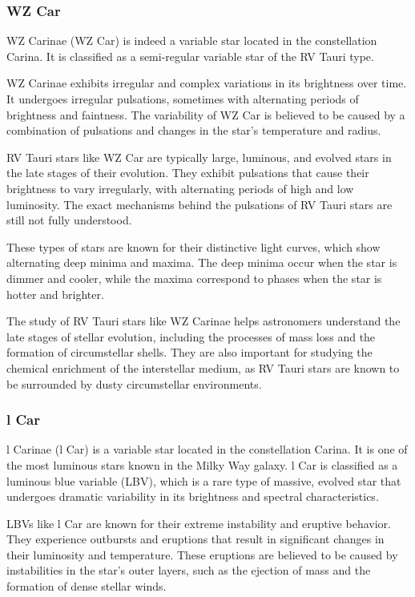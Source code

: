 \subsubsection*{ WZ Car }
WZ Carinae (WZ Car) is indeed a variable star located in the constellation Carina. It is classified as a semi-regular variable star of the RV Tauri type.

WZ Carinae exhibits irregular and complex variations in its brightness over time. It undergoes irregular pulsations, sometimes with alternating periods of brightness and faintness. The variability of WZ Car is believed to be caused by a combination of pulsations and changes in the star's temperature and radius.

RV Tauri stars like WZ Car are typically large, luminous, and evolved stars in the late stages of their evolution. They exhibit pulsations that cause their brightness to vary irregularly, with alternating periods of high and low luminosity. The exact mechanisms behind the pulsations of RV Tauri stars are still not fully understood.

These types of stars are known for their distinctive light curves, which show alternating deep minima and maxima. The deep minima occur when the star is dimmer and cooler, while the maxima correspond to phases when the star is hotter and brighter.

The study of RV Tauri stars like WZ Carinae helps astronomers understand the late stages of stellar evolution, including the processes of mass loss and the formation of circumstellar shells. They are also important for studying the chemical enrichment of the interstellar medium, as RV Tauri stars are known to be surrounded by dusty circumstellar environments.

\subsubsection*{ l Car }
l Carinae (l Car) is a variable star located in the constellation Carina. It is one of the most luminous stars known in the Milky Way galaxy. l Car is classified as a luminous blue variable (LBV), which is a rare type of massive, evolved star that undergoes dramatic variability in its brightness and spectral characteristics.

LBVs like l Car are known for their extreme instability and eruptive behavior. They experience outbursts and eruptions that result in significant changes in their luminosity and temperature. These eruptions are believed to be caused by instabilities in the star's outer layers, such as the ejection of mass and the formation of dense stellar winds.

